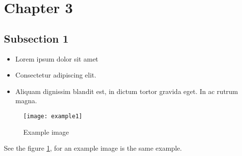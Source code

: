 \section{Chapter 3}

\lipsum[4]

\subsection{Subsection 1}

\begin{itemize}
\item Lorem ipsum dolor sit amet\cite{example}
\item Consectetur adipiscing elit. 
\item Aliquam dignissim blandit est, in dictum tortor gravida eget. In ac rutrum magna.
\end{itemize}


\begin{figure}[h]
\centering
\texttt{[image: example1]}
\caption{Example image}
\label{fig:image1}
\end{figure}

See the figure \ref{fig:image1}, for an example image \pageref{fig:image1} is the same example.

